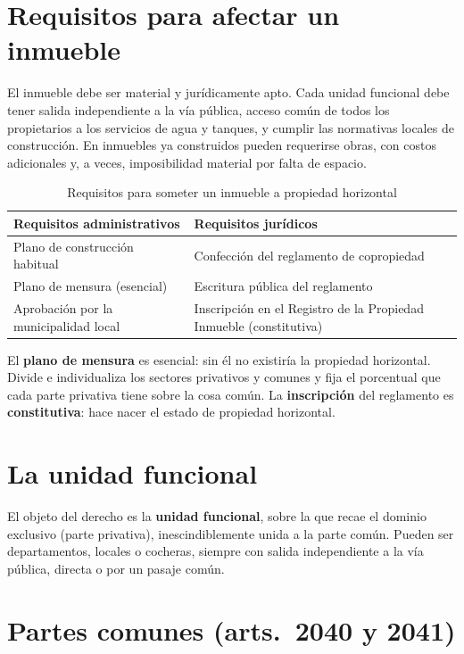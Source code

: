 \documentclass[12pt,oneside]{book}
\begin{document}
\section{Requisitos para afectar un inmueble}

El inmueble debe ser material y jurídicamente apto. Cada unidad funcional debe tener salida independiente a la vía pública, acceso común de todos los propietarios a los servicios de agua y tanques, y cumplir las normativas locales de construcción. En inmuebles ya construidos pueden requerirse obras, con costos adicionales y, a veces, imposibilidad material por falta de espacio.

\begin{table}[H]
\centering
\small
\begin{tabularx}{\textwidth}{>{\raggedright\arraybackslash}X>{\raggedright\arraybackslash}X}
\toprule
\textbf{Requisitos administrativos} & \textbf{Requisitos jurídicos} \\
\midrule
Plano de construcción habitual & Confección del reglamento de copropiedad \\
Plano de mensura (esencial) & Escritura pública del reglamento \\
Aprobación por la municipalidad local & Inscripción en el Registro de la Propiedad Inmueble (constitutiva) \\
\bottomrule
\end{tabularx}
\caption{Requisitos para someter un inmueble a propiedad horizontal}
\end{table}

El \textbf{plano de mensura} es esencial: sin él no existiría la propiedad horizontal. Divide e individualiza los sectores privativos y comunes y fija el porcentual que cada parte privativa tiene sobre la cosa común. La \textbf{inscripción} del reglamento es \textbf{constitutiva}: hace nacer el estado de propiedad horizontal.

\section{La unidad funcional}

El objeto del derecho es la \textbf{unidad funcional}, sobre la que recae el dominio exclusivo (parte privativa), inescindiblemente unida a la parte común. Pueden ser departamentos, locales o cocheras, siempre con salida independiente a la vía pública, directa o por un pasaje común.

\section{Partes comunes (arts.~2040 y 2041)}
\end{document}
